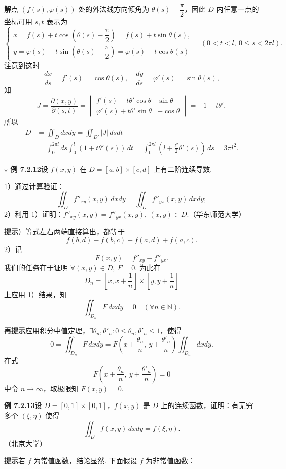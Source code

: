 \documentclass[UTF8, 12pt, fontset=fandol, oneside]{ctexart}
\begin{document}
\noindent\textbf{解}\quad 点 $(f(s),\varphi(s))$ 处的外法线方向倾角为 $\theta(s)-\dfrac\pi2$，因此 $D$ 内任意一点的坐标可用 $s,t$ 表示为
\[
\begin{cases}
x=f(s)+t\cos\left(\theta(s)-\dfrac\pi2\right)=f(s)+t\sin\theta(s),\\
y=\varphi(s)+t\sin\left(\theta(s)-\dfrac\pi2\right)=\varphi(s)-t\cos\theta(s)
\end{cases}
\quad(0<t<l,\ 0\le s<2\pi l).
\]
注意到这时
\[
\frac{dx}{ds}=f'(s)=\cos\theta(s),\quad \frac{dy}{ds}=\varphi'(s)=\sin\theta(s),
\]
知
\[
J=\frac{\partial(x,y)}{\partial(s,t)}
=\begin{vmatrix}
f'(s)+t\theta'\cos\theta&\sin\theta\\
\varphi'(s)+t\theta'\sin\theta&-\cos\theta
\end{vmatrix}
=-1-t\theta',
\]
所以
\[
\begin{aligned}
D&=\iint_Ddxdy=\iint_{D'}|J|\,dsdt\\
&=\int_0^{2\pi l}ds\int_0^l(1+t\theta'(s))\,dt
=\int_0^{2\pi l}\left(l+\frac{l^2}2\theta'(s)\right)\,ds=3\pi l^2.
\end{aligned}
\]

\noindent\textbf{$\star$ 例 7.2.12}\quad 设 $f(x,y)$ 在 $D=[a,b]\times[c,d]$ 上有二阶连续导数.

1）通过计算验证：
\[
\iint_D f''_{xy}(x,y)\,dxdy=\iint_D f''_{yx}(x,y)\,dxdy;
\]
2）利用 1）证明：$f''_{xy}(x,y)=f''_{yx}(x,y),\ (x,y)\in D$.（华东师范大学）

\noindent\textbf{提示}）等式左右两端直接算出，都等于
\[
f(b,d)-f(b,c)-f(a,d)+f(a,c).
\]
2）记
\[
F(x,y)=f''_{xy}-f''_{yx}.
\]
我们的任务在于证明 $\forall(x,y)\in D,\ F=0$. 为此在
\[
D_n=\left[x,x+\frac1n\right]\times\left[y,y+\frac1n\right]
\]
上应用 1）结果，知
\[
\iint_{D_n}F\,dxdy=0\quad(\forall n\in\mathbb N).
\]

\noindent\textbf{再提示}\quad 应用积分中值定理，$\exists\theta_n,\theta'_n:0\le\theta_n,\theta'_n\le1$，使得
\[
0=\iint_{D_n}F\,dxdy
=F\left(x+\frac{\theta_n}n,\ y+\frac{\theta'_n}n\right)\iint_{D_n}dxdy.
\]
在式
\[
F\left(x+\frac{\theta_n}n,\ y+\frac{\theta'_n}n\right)=0
\]
中令 $n\to\infty$，取极限知 $F(x,y)=0$.

\noindent\textbf{例 7.2.13}\quad 设 $D=[0,1]\times[0,1]$，$f(x,y)$ 是 $D$ 上的连续函数，证明：有无穷多个 $(\xi,\eta)$ 使得
\[
\iint_D f(x,y)\,dxdy=f(\xi,\eta).
\]
（北京大学）

\noindent\textbf{提示}\quad 若 $f$ 为常值函数，结论显然. 下面假设 $f$ 为非常值函数：
\end{document}
